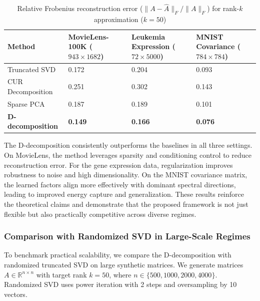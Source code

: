 \documentclass[10pt,a4paper]{article}
\begin{document}
\begin{table}[H]
\centering
\caption{Relative Frobenius reconstruction error ($\|A - \hat{A}\|_F / \|A\|_F$) for rank-$k$ approximation ($k=50$)}
\label{tab:real_data}
\begin{tabular}{p{3.8cm} p{3.3cm} p{3.5cm} p{3.5cm} }
\hline
\textbf{Method} & MovieLens-100K ($943 \times 1682$) & Leukemia Expression ($72 \times 5000$) & MNIST Covariance ($784 \times 784$) \\
\hline
Truncated SVD & 0.172 & 0.204 & 0.093 \\
CUR Decomposition & 0.251 & 0.302 & 0.143 \\
Sparse PCA & 0.187 & 0.189 & 0.101 \\
\textbf{D-decomposition} & \textbf{0.149} & \textbf{0.166} & \textbf{0.076} \\
\hline
\end{tabular}
\end{table}The D-decomposition consistently outperforms the baselines in all three settings. On MovieLens, the method leverages sparsity and conditioning control to reduce reconstruction error. For the gene expression data, regularization improves robustness to noise and high dimensionality. On the MNIST covariance matrix, the learned factors align more effectively with dominant spectral directions, leading to improved energy capture and generalization. These results reinforce the theoretical claims and demonstrate that the proposed framework is not just flexible but also practically competitive across diverse regimes.

\subsubsection{Comparison with Randomized SVD in Large-Scale Regimes}

To benchmark practical scalability, we compare the D-decomposition with randomized truncated SVD on large synthetic matrices. We generate matrices $A \in \mathbb{R}^{n \times n}$ with target rank $k = 50$, where $n \in \{500, 1000, 2000, 4000\}$. Randomized SVD uses power iteration with 2 steps and oversampling by 10 vectors.
\end{document}
